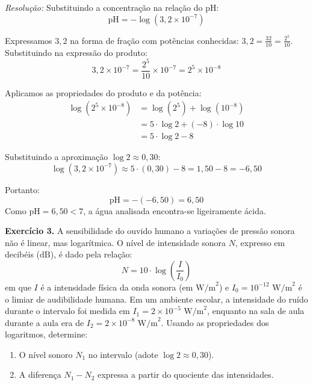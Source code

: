 \documentclass[12pt,a4paper]{report}
\begin{document}
	\textit{Resolução:}  
	Substituindo a concentração na relação do $\text{pH}$:
	$$\text{pH} = -\log (3{,}2 \times 10^{-7})$$
	
	Expressamos $3{,}2$ na forma de fração com potências conhecidas: $3{,}2 = \frac{32}{10} = \frac{2^5}{10}$.  
	Substituindo na expressão do produto:
	$$3{,}2 \times 10^{-7} = \frac{2^5}{10} \times 10^{-7} = 2^5 \times 10^{-8}$$
	
	Aplicamos as propriedades do produto e da potência:
	\begin{align*}
		\log (2^5 \times 10^{-8}) &= \log(2^5) + \log(10^{-8}) \\
		&= 5 \cdot \log 2 + (-8) \cdot \log 10 \\
		&= 5 \cdot \log 2 - 8
	\end{align*}
	
	Substituindo a aproximação $\log 2 \approx 0{,}30$:
	$$\log (3{,}2 \times 10^{-7}) \approx 5 \cdot (0{,}30) - 8 = 1{,}50 - 8 = -6{,}50$$
	
	Portanto:
	$$\text{pH} = -(-6{,}50) = 6{,}50$$
	Como $\text{pH} = 6{,}50 < 7$, a água analisada encontra-se ligeiramente ácida.
	
	\vspace{0.3cm}
	
	\textbf{Exercício 3.}  A sensibilidade do ouvido humano a variações de pressão sonora não é linear, mas logarítmica. O nível de intensidade sonora $N$, expresso em decibéis ($\text{dB}$), é dado pela relação:
	$$N = 10 \cdot \log \left(\frac{I}{I_0}\right)$$
	em que $I$ é a intensidade física da onda sonora (em $\text{W/m}^2$) e $I_0 = 10^{-12}\text{ W/m}^2$ é o limiar de audibilidade humana.  
	Em um ambiente escolar, a intensidade do ruído durante o intervalo foi medida em $I_1 = 2 \times 10^{-5}\text{ W/m}^2$, enquanto na sala de aula durante a aula era de $I_2 = 2 \times 10^{-8}\text{ W/m}^2$.  
	Usando as propriedades dos logaritmos, determine:
	\begin{enumerate}[label=\textbf{\alph*)}]
		\item O nível sonoro $N_1$ no intervalo (adote $\log 2 \approx 0{,}30$).
		\item A diferença $N_1 - N_2$ expressa a partir do quociente das intensidades.
	\end{enumerate}
	
\end{document}
